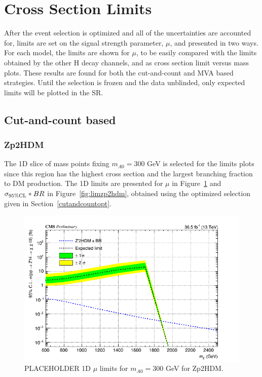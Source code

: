 \section{Cross Section Limits}

After the event selection is optimized and all of the uncertainties are accounted for, limits are set on the signal strength parameter, $\mu$, and presented in two ways. For each model, the limits are shown for $\mu$, to be easily compared with the limits obtained by the other H decay channels, and as cross section limit versus mass plots. These results are found for both the cut-and-count and MVA based strategies. Until the selection is frozen and the data unblinded, only expected limits will be plotted in the SR.

\subsection{Cut-and-count based}

\subsubsection{Zp2HDM}

The 1D slice of mass points fixing $m_{A0} = 300$ GeV is selected for the limits plots since this region has the highest cross section and the largest branching fraction to DM production. The 1D limits are presented for $\mu$ in Figure~\ref{fig:limzp2hdmmu} and $\sigma_{95\% \rm{CL}}*BR$ in Figure~\ref{fig:limzp2hdm}, obtained using the optimized selection given in Section~\ref{cutandcountopt}.  

\begin{figure}[tbh]
\centering
\includegraphics[width=5in]{figures/sigma_limits_4mu_Zp2HDM.png}
\caption{PLACEHOLDER 1D $\mu$ limits for $m_{A0} = 300$ GeV for Zp2HDM.}
\label{fig:limzp2hdmmu}
\end{figure}


